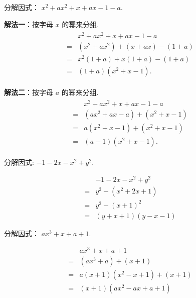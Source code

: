 \begin{example}[殊途同归]
	分解因式： $x^{2}+a x^{2}+x+a x-1-a$.
\end{example}
\begin{solution}
	\textbf{解法一}：按字母 $x$ 的幂来分组.
	\begin{align*}
		\begin{aligned}
			  & x^{2}+a x^{2}+x+a x-1-a                  \\
			= & \left(x^{2}+a x^{2}\right)+(x+a x)-(1+a) \\
			= & x^{2}(1+a)+x(1+a)-(1+a)                  \\
			= & (1+a)\left(x^{2}+x-1\right) .
		\end{aligned}
	\end{align*}

	\textbf{解法二}：按字母 $a$ 的幂来分组.
	\begin{align*}
		\begin{aligned}
			  & x^{2}+a x^{2}+x+a x-1-a                           \\
			= & \left(a x^{2}+a x-a\right)+\left(x^{2}+x-1\right) \\
			= & a\left(x^{2}+x-1\right)+\left(x^{2}+x-1\right)    \\
			= & (a+1)\left(x^{2}+x-1\right) .
		\end{aligned}
	\end{align*}
\end{solution}

\begin{example}[瞄准公式]
	分解因式: $-1-2 x-x^{2}+y^{2}$.
\end{example}
\begin{solution}
	\begin{align*}
		  & -1-2 x-x^{2}+y^{2}             \\
		= & y^{2}-\left(x^{2}+2 x+1\right) \\
		= & y^{2}-(x+1)^{2}                \\
		= & (y+x+1)(y-x-1)
	\end{align*}
\end{solution}

\begin{example}[瞄准公式]
	分解因式： $a x^{3}+x+a+1$.
\end{example}
\begin{solution}
	\begin{align*}
		  & a x^{3}+x+a+1                      \\
		= & \left(a x^{3}+a\right)+(x+1)       \\
		= & a(x+1)\left(x^{2}-x+1\right)+(x+1) \\
		= & (x+1)\left(a x^{2}-a x+a+1\right)
	\end{align*}
\end{solution}

